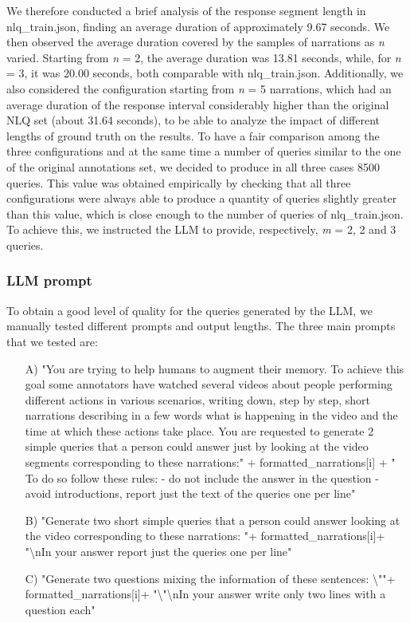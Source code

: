 \documentclass[10pt,twocolumn,letterpaper]{article}
\begin{document}
We therefore conducted a brief analysis of the response segment length in nlq\_train.json, finding an average duration of approximately 9.67 seconds. We then observed the average duration covered by the samples of narrations as \textit{n} varied. Starting from \textit{n} = 2, the average duration was 13.81 seconds, while, for \textit{n} = 3, it was 20.00 seconds, both comparable with nlq\_train.json. 
Additionally, we also considered the configuration starting from \textit{n} = 5 narrations, which had an average duration of the response interval considerably higher than the original NLQ set (about 31.64 seconds), to be able to analyze the impact of different lengths of ground truth on the results.
To have a fair comparison among the three configurations and at the same time a number of queries similar to the one of the original annotations set, we decided to produce in all three cases 8500 queries. This value was obtained empirically by checking that all three configurations were always able to produce a quantity of queries slightly greater than this value, which is close enough to the number of queries of nlq\_train.json. To achieve this, we instructed the LLM to provide, respectively, \textit{m} = 2, 2 and 3 queries.

\subsubsection{LLM prompt}
To obtain a good level of quality for the queries generated by the LLM, we manually tested different prompts and output lengths. The three main prompts that we tested are:

\begin{enumerate}
    \item[A)] "You are trying to help humans to augment their memory. To achieve this goal some annotators have watched several videos about people performing different actions in various scenarios, writing down, step by step, short narrations describing in a few words what is happening in the video and the time at which these actions take place. You are requested to generate 2 simple queries that a person could answer just by looking at the video segments corresponding to these narrations:" + formatted\_narrations[i] + " To do so follow these rules:  - do not include the answer in the question - avoid introductions, report just the text of the queries one per line"
    \item[B)] "Generate two short simple queries that a person could answer looking at the video corresponding to these narrations: "+ formatted\_narrations[i]+ "\textbackslash nIn your answer report just the queries one per line"
    \item[C)] "Generate two questions mixing the information of these sentences: \textbackslash""+ formatted\_narrations[i]+ "\textbackslash"\textbackslash nIn your answer write only two lines with a question each"
\end{enumerate}
\end{document}
